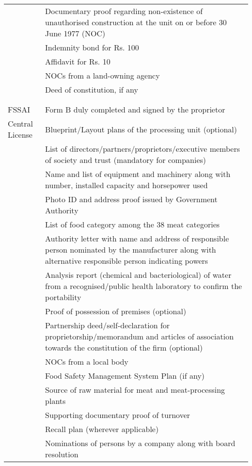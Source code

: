 \documentclass[a4paper, 12pt]{article}
\begin{document}
\begin{longtable}{>{\raggedright}p{2.5cm}>{\raggedright\arraybackslash}p{13cm}}
          & Documentary proof regarding non-existence of unauthorised construction at the unit on or before 30 June 1977 (NOC) \\
          & Indemnity bond for Rs. 100 \\
          & Affidavit for Rs. 10  \\
          & NOCs from a land-owning agency  \\
          & Deed of constitution, if any \\
	& \\
	&\\
    \midrule
    FSSAI & Form B duly completed and signed by the proprietor \\
    Central License & Blueprint/Layout plans of the processing unit (optional) \\
    & List of directors/partners/proprietors/executive members of society and trust (mandatory for companies) \\
          & Name and list of equipment and machinery along with number, installed capacity and horsepower used \\
          & Photo ID and address proof issued by Government Authority \\
          & List of food category among the 38 meat categories \\
          & Authority letter with name and address of responsible person nominated by the manufacturer along with alternative responsible person indicating powers   \\
          & Analysis report (chemical and bacteriological) of water from a recognised/public health laboratory to confirm the portability \\
          & Proof of possession of premises (optional) \\
          & Partnership deed/self-declaration for proprietorship/memorandum and articles of association towards the constitution of the firm (optional) \\
          & NOCs from a local body  \\
          & Food Safety Management System Plan (if any) \\
          & Source of raw material for meat and meat-processing plants \\
          & Supporting documentary proof of turnover \\
          & Recall plan (wherever applicable) \\
          & Nominations of persons by a company along with board resolution \\

\end{longtable}
\end{document}
